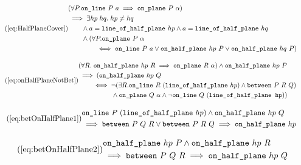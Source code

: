 \begin{equation}\tag{\ref{eq:HalfPlaneCover}}
  \begin{split}
    &(\forall P. \code{on\_line}\ P\ a \implies \code{on\_plane}\ P\ \alpha)\\
    &\implies \exists hp\; hq.\; hp \neq hq\\
    &\qquad \wedge a = \code{line\_of\_half\_plane}\ hp \wedge a = \code{line\_of\_half\_plane}\ hq\\
    &\qquad \wedge (\forall P. \code{on\_plane}\ P\ \alpha\\
    &\qquad\qquad \iff \code{on\_line}\ P\ a \vee \code{on\_half\_plane}\ hp\ P \vee \code{on\_half\_plane}\ hq\ P)
  \end{split}
\end{equation}

\begin{equation}\tag{\ref{eq:onHalfPlaneNotBet}}
  \begin{split}
    &(\forall R.\; \code{on\_half\_plane}\ hp\ R \implies \code{on\_plane}\ R\ \alpha) \wedge \code{on\_half\_plane}\ hp\ P\\
    &\implies (\code{on\_half\_plane}\ hp\ Q\\
    &\qquad \iff \neg(\exists R. \code{on\_line}\ R\ (\code{line\_of\_half\_plane}\ hp) \wedge \between{P}{R}{Q})\\
    &\qquad\qquad\quad \wedge \code{on\_plane}\ Q\ \alpha \wedge \neg\code{on\_line}\ Q\ (\code{line\_of\_half\_plane hp}))
  \end{split}
\end{equation}

\begin{equation}\tag{\ref{eq:betOnHalfPlane1}}
  \begin{split}
    &\code{on\_line}\ P\ (\code{line\_of\_half\_plane}\ hp) \wedge \code{on\_half\_plane}\ hp\ Q\\
    &\implies \between{P}{Q}{R} \vee \between{P}{R}{Q} \implies \code{on\_half\_plane}\ hp
  \end{split}
\end{equation}

\begin{equation}\tag{\ref{eq:betOnHalfPlane2}}
  \begin{split}
    &\code{on\_half\_plane}\ hp\ P \wedge \code{on\_half\_plane}\ hp\ R\\
    &\implies \between{P}{Q}{R} \implies \code{on\_half\_plane}\ hp\ Q
  \end{split}
\end{equation}

